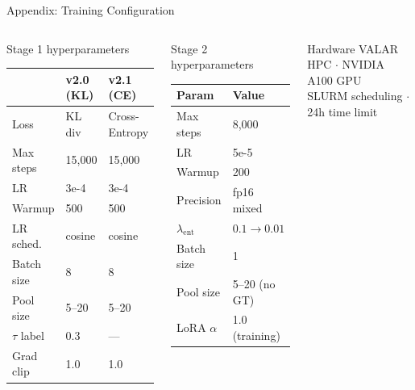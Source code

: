 \documentclass[aspectratio=169,10pt]{beamer}
\begin{document}
\begin{frame}[shrink=15]{Appendix: Training Configuration}
  \begin{columns}[T]
      \begin{block}{Stage 1 hyperparameters}
        \begin{tabular}{lll}
          \toprule
          & v2.0 (KL) & v2.1 (CE) \\
          \midrule
          Loss & KL div & Cross-Entropy \\
          Max steps & 15,000 & 15,000 \\
          LR & 3e-4 & 3e-4 \\
          Warmup & 500 & 500 \\
          LR sched. & cosine & cosine \\
          Batch size & 8 & 8 \\
          Pool size & 5–20 & 5–20 \\
          $\tau$ label & 0.3 & --- \\
          Grad clip & 1.0 & 1.0 \\
          \bottomrule
        \end{tabular}
      \end{block}

      \begin{block}{Stage 2 hyperparameters}
        \begin{tabular}{ll}
          \toprule
          Param & Value \\
          \midrule
          Max steps & 8,000 \\
          LR & 5e-5 \\
          Warmup & 200 \\
          Precision & fp16 mixed \\
          $\lambda_\text{ent}$ & $0.1 \to 0.01$ \\
          Batch size & 1 \\
          Pool size & 5–20 (no GT) \\
          LoRA $\alpha$ & 1.0 (training) \\
          \bottomrule
        \end{tabular}
      \end{block}
      \begin{block}{Hardware}
        VALAR HPC $\cdot$ NVIDIA A100 GPU\\
        SLURM scheduling $\cdot$ 24h time limit
      \end{block}
  \end{columns}
\end{frame}
\end{document}
